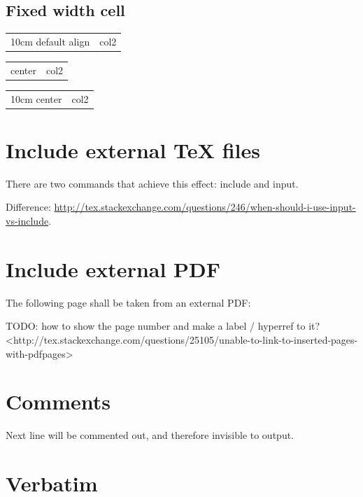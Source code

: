 \documentclass[12pt]{article}
\begin{document}
  \subsection{Fixed width cell}\label{fixed-width-cell}

    \begin{tabular}{>{}m{10cm} | l}
      10cm default align & col2
    \end{tabular}

    \begin{tabular}{>{\centering}m{10cm} | l}
      10cm center & col2
    \end{tabular}

    \begin{tabular}{>{}m{10cm} | l}
      10cm center & col2
    \end{tabular}

\section{Include external TeX files}\label{include}

  There are two commands that achieve this effect: include and input.

  Difference: \url{http://tex.stackexchange.com/questions/246/when-should-i-use-input-vs-include}.

\section{Include external PDF}\label{include-external-pdf}

  The following page shall be taken from an external PDF:

  

  TODO: how to show the page number and make a label / hyperref to it? <http://tex.stackexchange.com/questions/25105/unable-to-link-to-inserted-pages-with-pdfpages>

\section{Comments}\label{comments}

    Next line will be commented out, and therefore invisible to output.

\section{Verbatim}\label{verbatim}
\end{document}
